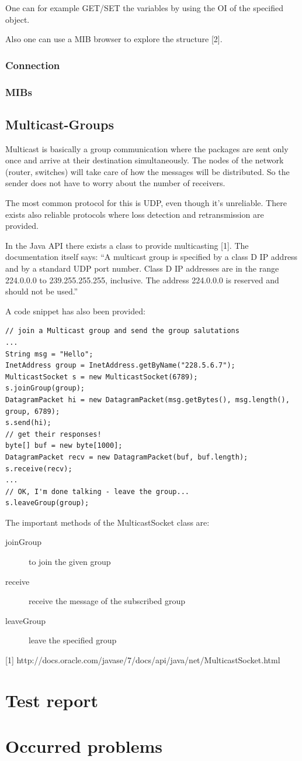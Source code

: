 \documentclass[11pt, a4paper]{article}
\begin{document}
One can for example GET/SET the variables by using the OI of the specified object.

Also one can use a MIB browser to explore the structure [2].
\subsubsection{Connection}
\subsubsection{MIBs}
\subsection{Multicast-Groups}

Multicast is basically a group communication where the packages are sent only once and arrive at their destination simultaneously. The nodes of the network (router, switches) will take care of how the messages will be distributed. So the sender does not have to worry about the number of receivers.

The most common protocol for this is UDP, even though it’s unreliable. There exists also reliable protocols where loss detection and retransmission are provided.


In the Java API there exists a class to provide multicasting [1]. The documentation itself says:
“A multicast group is specified by a class D IP address and by a standard UDP port number. Class D IP addresses are in the range 224.0.0.0 to 239.255.255.255, inclusive. The address 224.0.0.0 is reserved and should not be used.”

A code snippet has also been provided:

\begin{lstlisting}
// join a Multicast group and send the group salutations
...
String msg = "Hello";
InetAddress group = InetAddress.getByName("228.5.6.7");
MulticastSocket s = new MulticastSocket(6789);
s.joinGroup(group);
DatagramPacket hi = new DatagramPacket(msg.getBytes(), msg.length(),
group, 6789);
s.send(hi);
// get their responses!
byte[] buf = new byte[1000];
DatagramPacket recv = new DatagramPacket(buf, buf.length);
s.receive(recv);
...
// OK, I'm done talking - leave the group...
s.leaveGroup(group);
\end{lstlisting}

The important methods of the MulticastSocket class are:
\begin{description}
\item[joinGroup] to join the given group
\item[receive] receive the message of the subscribed group
\item[leaveGroup] leave the specified group
\end{description}




[1] http://docs.oracle.com/javase/7/docs/api/java/net/MulticastSocket.html

\section{Test report}
\section{Occurred problems}

\nocite{*}

{}
\end{document}
